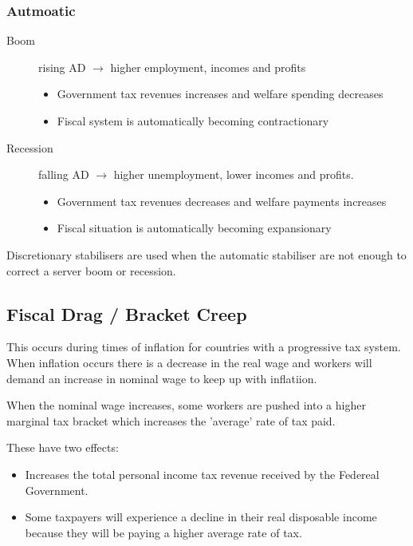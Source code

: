 \documentclass[11pt]{article}
\begin{document}
\subsubsection{Autmoatic}
\label{sec-1-5-1}

\begin{description}
\item[{Boom}] rising AD $\rightarrow$ higher employment, incomes and
profits
\begin{itemize}
\item Government tax revenues increases and welfare spending decreases
\item Fiscal system is automatically becoming contractionary
\end{itemize}
\item[{Recession}] falling AD $\rightarrow$ higher unemployment,
lower incomes and profits.
\begin{itemize}
\item Government tax revenues decreases and welfare payments increases
\item Fiscal situation is automatically becoming expansionary
\end{itemize}
\end{description}

Discretionary stabilisers are used when the automatic stabiliser are
not enough to correct a server boom or recession.




\subsection{Fiscal Drag / Bracket Creep}
\label{sec-1-6}

This occurs during times of inflation for countries with a progressive
tax system. When inflation occurs there is a decrease in the real wage
and workers will demand an increase in nominal wage to keep up with
inflatiion.

When the nominal wage increases, some workers are pushed into a higher
marginal tax bracket which increases the 'average' rate of tax paid.

These have two effects:

\begin{itemize}
\item Increases the total personal income tax revenue received by the
Federeal Government.
\item Some taxpayers will experience a decline in their real disposable
income because they will be paying a higher average rate of tax.
\end{itemize}
\end{document}
